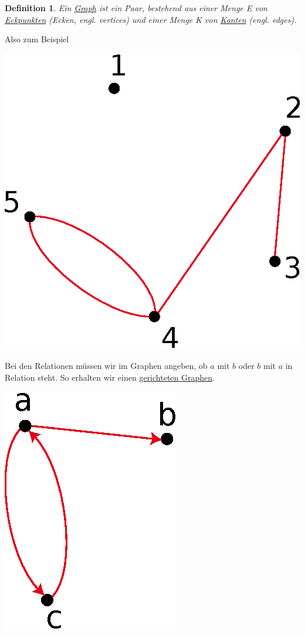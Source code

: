 \documentclass{report}
\newtheorem{mydef}{Definition}
\begin{document}
\begin{mydef}Ein \underline{Graph} ist ein Paar, bestehend aus einer Menge E von \underline{Eckpunkten} (Ecken, engl. vertices) und einer Menge K von \underline{Kanten} (engl. edges).\end{mydef}
Also zum Beispiel
\begin{center}\includegraphics[scale=0.25]{img/3-r-as-graph-example-1.eps}\end{center}
Bei den Relationen müssen wir im Graphen angeben, ob $a$ mit $b$ oder $b$ mit $a$ in Relation steht. So erhalten wir einen \underline{gerichteten Graphen}.
\begin{center}\includegraphics[scale=0.25]{img/3-r-as-graph-example-2.eps}\end{center}
\end{document}
